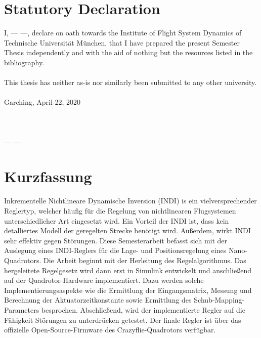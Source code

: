\documentclass[11pt, a4paper, twoside]{report}
\begin{document}



\newpage\null\thispagestyle{empty}\newpage


\vspace*{-0.8cm}
\section*{Statutory Declaration}
I, --- ---, declare on oath towards the Institute of Flight System Dynamics of Technische Universit\"at M\"unchen, that I have prepared the present Semester Thesis independently and with the aid of nothing but the resources listed in the bibliography.
\\
\\
This thesis has neither as-is nor similarly been submitted to any other university.
\bigskip
\\
\\
Garching, April 22, 2020
\\
\\
\\
\\
--- ---

\thispagestyle{fancy_beginning}
\renewcommand{\chaptermark}[1]{\markboth{#1}{}}
\chaptermark{Statutory Declaration}

\newpage\null\thispagestyle{empty}\newpage

\section*{Kurzfassung} \label{sec:kurzfassung}
\begin{itshape}
Inkrementelle Nichtlineare Dynamische Inversion (INDI) is ein vielversprechender Reglertyp, welcher h\"aufig f\"ur die Regelung von nichtlinearen Flugsystemen unterschiedlicher Art eingesetzt wird. Ein Vorteil der INDI ist, dass kein detalliertes Modell der geregelten Strecke ben\"otigt wird. Au\ss{}erdem, wirkt INDI sehr effektiv gegen St\"orungen. Diese Semesterarbeit befasst sich mit der Auslegung eines INDI-Reglers f\"ur die Lage- und Positionsregelung eines Nano-Quadrotors. Die Arbeit beginnt mit der Herleitung des Regelalgorithmus. Das hergeleitete Regelgesetz wird dann erst in Simulink entwickelt und anschlie\ss{}end auf der Quadrotor-Hardware implementiert. Dazu werden solche Implementierungsaspekte wie die Ermittlung der Eingangsmatrix, Messung und Berechnung der Aktuatorzeitkonstante sowie Ermittlung des Schub-Mapping-Parameters besprochen. Abschlie\ss{}end, wird der implementierte Regler auf die F\"ahigkeit St\"orungen zu unterdr\"ucken getestet. Der finale Regler ist \"uber das offizielle Open-Source-Firmware des Crazyflie-Quadrotors verf\"ugbar. 
\end{itshape}
\end{document}

